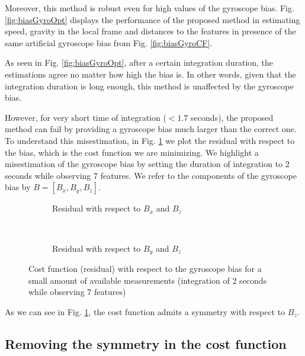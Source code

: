 \documentclass[letterpaper, 10 pt, conference]{ieeeconf}  %
\begin{document}
Moreover, this method is robust even for high values of the gyroscope bias.
Fig. \ref{fig:biasGyroOpt} displays the performance of the proposed method in estimating speed, gravity in the local frame and distances to the features in presence of the same artificial gyroscope bias from Fig. \ref{fig:biasGyroCF}.

As seen in Fig. \ref{fig:biasGyroOpt}, after a certain integration duration, the estimations agree no matter how high the bias is.
In other words, given that the integration duration is long enough, this method is unaffected by the gyroscope bias.

However, for very short time of integration ($<1.7$ seconds), the proposed method can fail by providing a gyroscope bias much larger than the correct one.
To understand this misestimation, in Fig. \ref{fig:cost} we plot the residual with respect to the bias, which is the cost function we are minimizing.
We highlight a misestimation of the gyroscope bias by setting the duration of integration to 2 seconds while observing 7 features.
We refer to the components of the gyroscope bias by $B = [B_x, B_y, B_z]$.

\begin{figure}
        \centering
        \begin{subfigure}[b]{0.489\columnwidth}
                \resizebox{\columnwidth}{!}{}
                \caption{Residual with respect to $B_x$ and $B_z$}
        \end{subfigure}~
        \begin{subfigure}[b]{0.489\columnwidth}
                \resizebox{\columnwidth}{!}{}
                \caption{Residual with respect to $B_y$ and $B_z$}
        \end{subfigure}
        \caption{Cost function (residual) with respect to the gyroscope bias for a small amount of available measurements (integration of 2 seconds while observing 7 features)\label{fig:cost}}
\end{figure}

As we can see in Fig. \ref{fig:cost}, the cost function admits a symmetry with respect to $B_z$.

\subsection{Removing the symmetry in the cost function}
\end{document}
